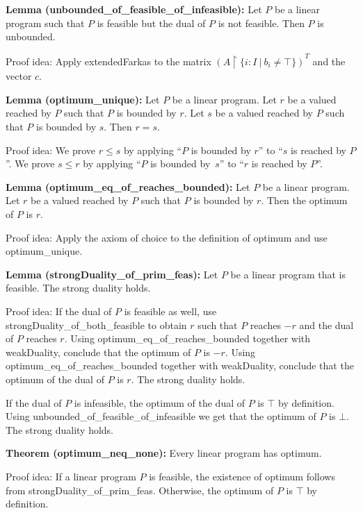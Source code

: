 \documentclass[]{article}
\renewcommand{\.}{\hskip .75pt}
\begin{document}
\medskip \noindent
\textbf{Lemma (unbounded\_of\_feasible\_of\_infeasible):}
Let $P$ be a linear program such that
$P$ is feasible but the dual of $P$ is not feasible.
Then $P$ is unbounded.

\medskip \noindent
Proof idea:
Apply extendedFarkas to the matrix
$\left( A \restriction \{ i : I ~|~ b_i \neq \top \} \right)^T$
and the vector $c$.

\medskip \noindent
\textbf{Lemma (optimum\_unique):}
Let $P$ be a linear program.
Let $r$ be a valued reached by $P$ such that $P$ is bounded by $r$.
Let $s$ be a valued reached by $P$ such that $P$ is bounded by $s$.
Then $r = s$.

\medskip \noindent
Proof idea:
We prove $r \le s$ by applying ``$P$ is bounded by $r$'' to
``$s$ is reached by $P$''.
We prove $s \le r$ by applying ``$P$ is bounded by~$s$'' to
``$r$ is reached by $P$''.

\medskip \noindent
\textbf{Lemma (optimum\_eq\_of\_reaches\_bounded):}
Let $P$ be a linear program.
Let $r$ be a valued reached by $P$ such that $P$ is bounded by $r$.
Then the optimum of $P$ is $r$.

\medskip \noindent
Proof idea:
Apply the axiom of choice to the definition of optimum and use optimum\_unique.

\medskip \noindent
\textbf{Lemma (strongDuality\_of\_prim\_feas):}
Let $P$ be a linear program that is feasible.
The strong duality holds.

\medskip \noindent
Proof idea:
If the dual of $P$ is feasible as well, use strongDuality\_of\_both\_feasible
to obtain $r$ such that $P$ reaches $-r$ and the dual of $P$ reaches $r$.
Using optimum\_eq\_of\_reaches\_bounded together with weakDuality,
conclude that the optimum of $P$ is $-r$.
Using optimum\_eq\_of\_reaches\_bounded together with weakDuality,
conclude that the optimum of the dual of $P$ is $r$.
The strong duality holds.

If the dual of $P$ is infeasible, the optimum of the dual of $P$ is
$\top$ by definition. Using unbounded\_of\_feasible\_of\_infeasible
we get that the optimum of $P$ is $\bot$.
The strong duality holds.

\medskip \noindent
\textbf{Theorem (optimum\_neq\_none):}
Every linear program has optimum.

\medskip \noindent
Proof idea:
If a linear program $P$ is feasible, the existence of optimum
follows from strongDuality\_of\_prim\_feas.
Otherwise, the optimum of $P$ is $\top$ by definition.
\end{document}
